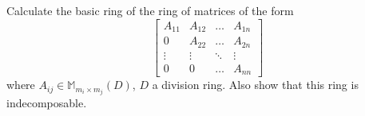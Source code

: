 Calculate the basic ring of the ring of matrices of the form
$$\begin{bmatrix}
A_{11} & A_{12} & \ldots & A_{1n} \\
0 & A_{22} & \ldots & A_{2n} \\
\vdots & \vdots & \ddots & \vdots \\
0 & 0 & \ldots & A_{nn}
\end{bmatrix}$$
where $A_{ij} \in \mathbb{M}_{m_i \times m_j}(D)$, $D$ a division ring. Also show that this ring is indecomposable.
